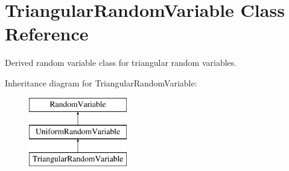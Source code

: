 \section{Triangular\+Random\+Variable Class Reference}
\label{classPecos_1_1TriangularRandomVariable}


Derived random variable class for triangular random variables.  


Inheritance diagram for Triangular\+Random\+Variable\+:\begin{figure}[H]
\begin{center}
\leavevmode
\includegraphics[height=3.000000cm]{classPecos_1_1TriangularRandomVariable}
\end{center}
\end{figure}
